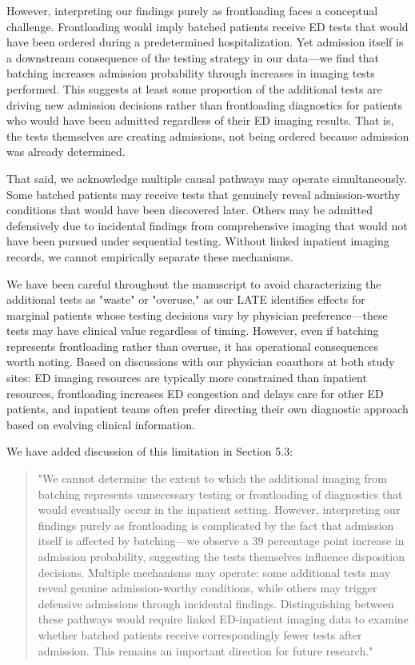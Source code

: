 \documentclass[11pt]{article}
\newcommand{\1}{\hbox{\rm 1\kern-.35em 1}}
\begin{document}
{However, interpreting our findings purely as frontloading faces a conceptual challenge. Frontloading would imply batched patients receive ED tests that would have been ordered during a predetermined hospitalization. Yet admission itself is a downstream consequence of the testing strategy in our data—we find that batching increases admission probability through increases in imaging tests performed. This suggests at least some proportion of the additional tests are driving new admission decisions rather than frontloading diagnostics for patients who would have been admitted regardless of their ED imaging results. That is, the tests themselves are creating admissions, not being ordered because admission was already determined.

That said, we acknowledge multiple causal pathways may operate simultaneously. Some batched patients may receive tests that genuinely reveal admission-worthy conditions that would have been discovered later. Others may be admitted defensively due to incidental findings from comprehensive imaging that would not have been pursued under sequential testing. Without linked inpatient imaging records, we cannot empirically separate these mechanisms.

We have been careful throughout the manuscript to avoid characterizing the additional tests as "waste" or "overuse," as our LATE identifies effects for marginal patients whose testing decisions vary by physician preference—these tests may have clinical value regardless of timing. However, even if batching represents frontloading rather than overuse, it has operational consequences worth noting. Based on discussions with our physician coauthors at both study sites: ED imaging resources are typically more constrained than inpatient resources, frontloading increases ED congestion and delays care for other ED patients, and inpatient teams often prefer directing their own diagnostic approach based on evolving clinical information.

We have added discussion of this limitation in Section 5.3:

\begin{quote}
"We cannot determine the extent to which the additional imaging from batching represents unnecessary testing or frontloading of diagnostics that would eventually occur in the inpatient setting. However, interpreting our findings purely as frontloading is complicated by the fact that admission itself is affected by batching—we observe a 39 percentage point increase in admission probability, suggesting the tests themselves influence disposition decisions. Multiple mechanisms may operate: some additional tests may reveal genuine admission-worthy conditions, while others may trigger defensive admissions through incidental findings. Distinguishing between these pathways would require linked ED-inpatient imaging data to examine whether batched patients receive correspondingly fewer tests after admission. This remains an important direction for future research."
\end{quote}

}
\end{document}
